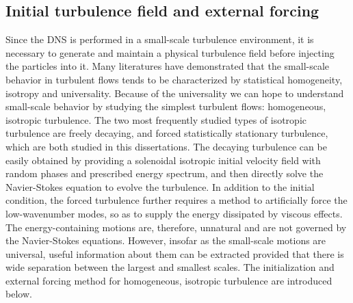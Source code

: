\subsection{Initial turbulence field and external forcing}
Since the DNS is performed in a small-scale turbulence environment, it is necessary to generate and maintain a physical turbulence field before injecting the particles into it. Many literatures \cite{} have demonstrated that the small-scale behavior in turbulent flows tends to be characterized by statistical homogeneity, isotropy and universality. Because of the universality we can hope to understand small-scale behavior by studying the simplest turbulent flows: homogeneous, isotropic turbulence. The two most frequently studied types of isotropic turbulence are freely decaying, and forced statistically stationary turbulence, which are both studied in this dissertations. The decaying turbulence can be easily obtained by providing a solenoidal isotropic initial velocity field with random phases and prescribed energy spectrum, and then directly solve the Navier-Stokes equation to evolve the turbulence. In addition to the initial condition, the forced turbulence further requires a method to artificially force the low-wavenumber modes, so as to supply the energy dissipated by viscous effects. The energy-containing motions are, therefore, unnatural and are not governed by the Navier-Stokes equations. However, insofar as the small-scale motions are universal, useful information about them can be extracted provided that there is wide separation between the largest and smallest scales. The initialization and external forcing method for homogeneous, isotropic turbulence are introduced below. 

